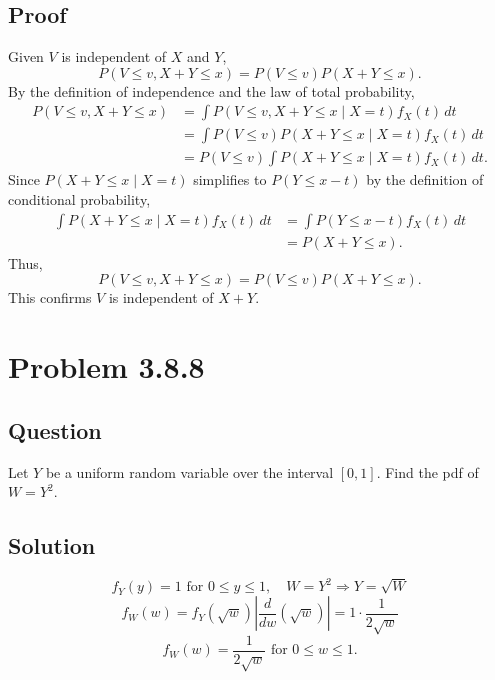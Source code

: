 \documentclass[12pt]{article}
\begin{document}
\subsection*{Proof}
Given \( V \) is independent of \( X \) and \( Y \),
\[
P(V \leq v, X + Y \leq x) = P(V \leq v) P(X + Y \leq x).
\]
By the definition of independence and the law of total probability,
\begin{align*}
P(V \leq v, X + Y \leq x) &= \int P(V \leq v, X + Y \leq x \mid X = t) f_X(t) \, dt \\
                          &= \int P(V \leq v) P(X + Y \leq x \mid X = t) f_X(t) \, dt \\
                          &= P(V \leq v) \int P(X + Y \leq x \mid X = t) f_X(t) \, dt.
\end{align*}
Since \( P(X + Y \leq x \mid X = t) \) simplifies to \( P(Y \leq x - t) \) by the definition of conditional probability,
\begin{align*}
\int P(X + Y \leq x \mid X = t) f_X(t) \, dt &= \int P(Y \leq x - t) f_X(t) \, dt \\
                                              &= P(X + Y \leq x).
\end{align*}
Thus,
\[
P(V \leq v, X + Y \leq x) = P(V \leq v) P(X + Y \leq x).
\]
This confirms \( V \) is independent of \( X + Y \).
\pagebreak


\section*{Problem 3.8.8}
\subsection*{Question}
Let \(Y\) be a uniform random variable over the interval \([0,1]\). Find the pdf of \(W = Y^2\).

\subsection*{Solution}
\[
  f_Y(y) = 1 \text{ for } 0 \leq y \leq 1, \quad W = Y^2 \Rightarrow Y = \sqrt{W}
\]
\[
  f_W(w) = f_Y(\sqrt{w}) \left| \frac{d}{dw}(\sqrt{w}) \right| = 1 \cdot \frac{1}{2\sqrt{w}}
\]
\[
  f_W(w) = \frac{1}{2\sqrt{w}} \text{ for } 0 \leq w \leq 1.
\]
\pagebreak
\end{document}
